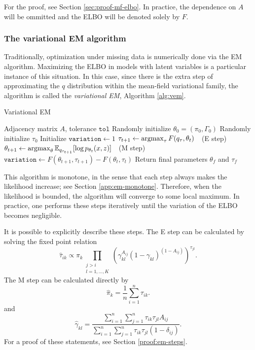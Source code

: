 \documentclass[../../main.tex]{subfiles} %
\begin{document}
For the proof, see Section \ref{sec:proof-mf-elbo}. In practice, the 
dependence on \(A\) will be ommitted and the ELBO will be denoted 
solely by \(F\).

\subsubsection{The variational EM algorithm}
Traditionally, optimization under missing data is numerically done via the EM 
algorithm. Maximizing the ELBO in models with latent variables is a particular 
instance of this situation. In this case, since there is the extra step of 
approximating the \(q\) distribution within the mean-field variational family, 
the algorithm is called the \textit{variational EM}, Algorithm \ref{alg:vem}.

\begin{algorithm}
	\caption{Variational EM}
	\label{alg:vem}
	\begin{algorithmic}
		\Require Adjacency matrix \(A\), 
		tolerance \(\texttt{tol}\)
		\State Randomly initialize 
		\(\theta_0 = (\pi_0, 
		\Gamma_0)\)
		\State Randomly initialize \(\tau_0\)
		\State Initialize \(\texttt{variation} \gets 1\)
		\State \(\tau_{t+1} \gets 
		\operatorname*{argmax}_\tau F(q_\tau, \theta_{t}) \quad\)(E step)
		\State \( \theta_{t+1} \gets 
	    \operatorname*{argmax}_\theta \mathbb 
		E_{q_{\tau_{t+1}}} [\log 
		p_{\theta_{t}} 
		(x, z)] \quad\)(M step)
		\State \(\texttt{variation} \gets 
		F(\theta_{t+1}, \tau_{t+1}) - 
		F(\theta_{t}, \tau_{t})\)
		\EndWhile
		\State Return final parameters \(\theta_f\) and \(\tau_f\)
	\end{algorithmic}
\end{algorithm}

This algorithm is monotone, in the sense that each step always 
makes the 
likelihood increase; see Section \ref{app:em-monotone}. Therefore, 
when the 
likelihood is bounded, the algorithm will converge to some local 
maximum. In 
practice, one performs these steps iteratively until the variation of the ELBO 
becomes negligible.

It is possible to explicitly describe these steps. The E step can be calculated 
by solving the fixed point relation
\begin{equation}
	\hat \tau_{ik} \propto \pi_k \prod_{\substack{j > i \\ l = 1, \dots, K}}
	\left( \gamma_{kl}^{A_{ij}} \left( 1 - \gamma_{kl} \right)^{\left( 1 -
		A_{ij}
		\right)} \right)^{\tau_{jl}}.
	\label{eq:fixed-point-tau}
\end{equation}
The M step can be calculated directly by
\begin{equation} \label{eq:pi-hat}
	\hat \pi_k = \frac{1}{n} \sum_{i=1}^n \tau_{ik}.
\end{equation}
and
\begin{equation} \label{eq:gamma-hat}
	\hat \gamma_{kl} = \frac{\sum_{i=1}^n \sum_{j=1}^n \tau_{ik}
		\tau_{jl} A_{ij}}{\sum_{i=1}^n \sum_{j=1}^n \tau_{ik} \tau_{jl} \left(
		1 - \delta_{ij} \right)}.
\end{equation}
For a proof of these statements, see Section \ref{proof:em-steps}.
\end{document}
